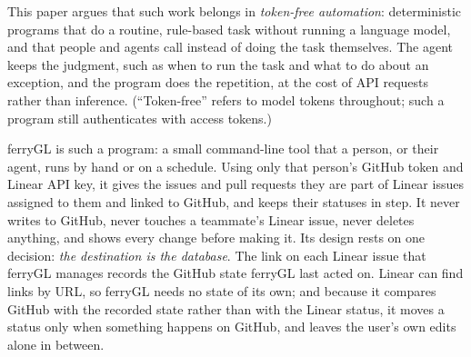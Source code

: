 \documentclass[11pt,a4paper]{article}
\newcommand{\ferry}{ferryGL}
\begin{document}
This paper argues that such work belongs in \emph{token-free automation}: deterministic
programs that do a routine, rule-based task without running a language model, and that people
and agents call instead of doing the task themselves. The agent keeps the judgment, such as
when to run the task and what to do about an exception, and the program does the repetition,
at the cost of API requests rather than inference. (\enquote{Token-free} refers to model tokens
throughout; such a program still authenticates with access tokens.)

\ferry{} is such a program: a small command-line tool that a person, or their agent, runs by
hand or on a schedule. Using only that person's GitHub token and Linear API key, it gives the
issues and pull requests they are part of Linear issues assigned to them and linked to GitHub,
and keeps their statuses in step. It never writes to GitHub, never touches a teammate's
Linear issue, never deletes anything, and shows every change before making it. Its design rests
on one decision: \emph{the destination is the database}. The link on each Linear issue that
\ferry{} manages records the GitHub state \ferry{} last acted on. Linear can find links by URL,
so \ferry{} needs no state of its own; and because it compares GitHub with the recorded state
rather than with the Linear status, it moves a status only when something happens on GitHub,
and leaves the user's own edits alone in between.
\end{document}
